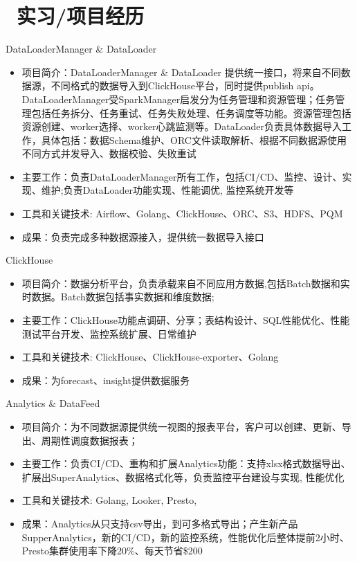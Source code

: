 \documentclass{resume}
\begin{document}
\section{\faUsers\ 实习/项目经历}
DataLoaderManager \& DataLoader
\begin{itemize}
  \item 项目简介：DataLoaderManager \& DataLoader 提供统一接口，将来自不同数据源，不同格式的数据导入到ClickHouse平台，同时提供publish api。DataLoaderManager受SparkManager启发分为任务管理和资源管理；任务管理包括任务拆分、任务重试、任务失败处理、任务调度等功能。资源管理包括资源创建、worker选择、worker心跳监测等。DataLoader负责具体数据导入工作，具体包括：数据Schema维护、ORC文件读取解析、根据不同数据源使用不同方式并发导入、数据校验、失败重试
  \item 主要工作：负责DataLoaderManager所有工作，包括CI/CD、监控、设计、实现、维护;负责DataLoader功能实现、性能调优, 监控系统开发等
  \item 工具和关键技术: Airflow、Golang、ClickHouse、ORC、S3、HDFS、PQM
  \item 成果：负责完成多种数据源接入，提供统一数据导入接口
\end{itemize}
ClickHouse
\begin{itemize}
  \item 项目简介：数据分析平台，负责承载来自不同应用方数据,包括Batch数据和实时数据。Batch数据包括事实数据和维度数据;
  \item 主要工作：ClickHouse功能点调研、分享；表结构设计、SQL性能优化、性能测试平台开发、监控系统扩展、日常维护
  \item 工具和关键技术: ClickHouse、ClickHouse-exporter、Golang
  \item 成果：为forecast、insight提供数据服务
\end{itemize}
Analytics \& DataFeed
\begin{itemize}
  \item 项目简介：为不同数据源提供统一视图的报表平台，客户可以创建、更新、导出、周期性调度数据报表；
  \item 主要工作：负责CI/CD、重构和扩展Analytics功能：支持xlsx格式数据导出、扩展出SuperAnalytics、数据格式化等，负责监控平台建设与实现, 性能优化
  \item 工具和关键技术: Golang, Looker, Presto, 
  \item 成果：Analytics从只支持csv导出，到可多格式导出；产生新产品SupperAnalytics，新的CI/CD，新的监控系统，性能优化后整体提前2小时、Presto集群使用率下降20\%、每天节省\$200
\end{itemize}
\end{document}
